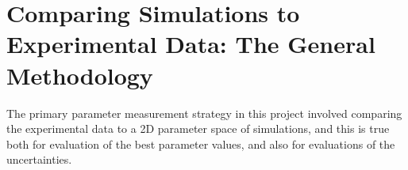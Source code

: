 


\FloatBarrier
\section{Comparing Simulations to Experimental Data:  The General Methodology}
\label{sec:comparing_data_sims}
The primary parameter measurement strategy in this project involved comparing the experimental data to a 2D parameter space of simulations, and this is true both for evaluation of the best parameter values, and also for evaluations of the uncertainties.  

